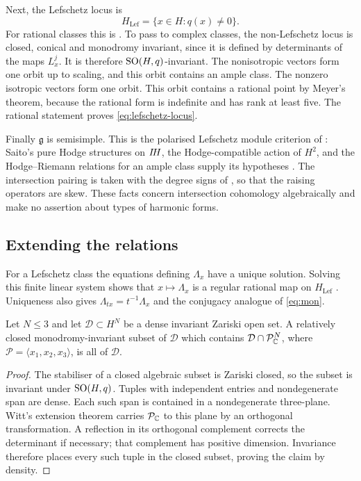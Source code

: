 Next, the Lefschetz locus is
\begin{equation}\label{eq:lefschetz-locus}
 H_{\mathrm{Lef}}=\{x\in H:q(x)\ne0\}.
\end{equation}
For rational classes this is \cite[Proposition~2.11]{tighe22}.
To pass to complex classes, the non-Lefschetz locus is closed,
conical and monodromy invariant, since it is defined by determinants
of the maps $L_x^j$. It is therefore $\operatorname{SO}(H,q)$-invariant. The
nonisotropic vectors form one orbit up to scaling, and this orbit
contains an ample class. The nonzero isotropic vectors form one
orbit. This orbit contains a rational point by Meyer's theorem,
because the rational form is indefinite and has rank at least five.
The rational statement proves \eqref{eq:lefschetz-locus}.

Finally $\mathfrak g$ is semisimple. This is the polarised Lefschetz
module criterion of \cite[Proposition~1.6]{ll97}: Saito's pure Hodge
structures on $I\!H$, the Hodge-compatible action of $H^2$, and the
Hodge--Riemann relations for an ample class supply its hypotheses
\cite{saito88,saito90,dcm05}. The intersection pairing is taken with
the degree signs of \cite[\S1.9]{ll97}, so that the raising
operators are skew. These facts concern intersection cohomology
algebraically and make no assertion about types of harmonic forms.

\subsection{Extending the relations}
For a Lefschetz class the equations defining $\Lambda_x$ have a
unique solution. Solving this finite linear system shows that
$x\mapsto\Lambda_x$ is a regular rational map on
$H_{\mathrm{Lef}}$ \cite[\S1.1]{ll97}. Uniqueness also gives
$\Lambda_{tx}=t^{-1}\Lambda_x$ and the conjugacy analogue of
\eqref{eq:mon}.

\begin{lemma}\label{lem:density}
Let $N\le3$ and let $\mathcal D\subset H^N$ be a dense invariant
Zariski open set. A relatively closed monodromy-invariant subset
of $\mathcal D$ which contains
$\mathcal D\cap\mathcal P_{\mathbb C}^N$, where
$\mathcal P=\langle x_1,x_2,x_3\rangle$, is all of $\mathcal D$.
\end{lemma}
\begin{proof}
The stabiliser of a closed algebraic subset is Zariski closed, so the
subset is invariant under $\operatorname{SO}(H,q)$. Tuples with independent
entries and nondegenerate span are dense. Each such span is contained
in a nondegenerate three-plane. Witt's extension theorem carries
$\mathcal P_{\mathbb C}$ to this plane by an orthogonal transformation.
A reflection in its orthogonal complement corrects the determinant
if necessary; that complement has positive dimension. Invariance
therefore places every such tuple in the closed subset, proving the
claim by density.
\end{proof}

